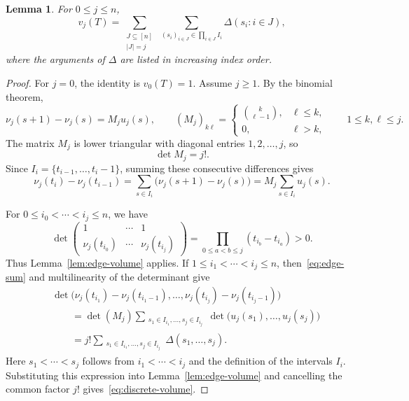 \documentclass[a4paper,reqno,11pt,oneside]{amsart}
\newtheorem{lem}[thm]{Lemma}
\theoremstyle{definition}
\theoremstyle{remark}
\begin{document}
\begin{lem}\label{lem:discrete-volume}
For $0\le j\le n$,
\begin{equation}\label{eq:discrete-volume}
    v_j(T)=\sum_{\substack{J\subseteq[n]\\|J|=j}} \ \sum_{(s_i)_{i\in J}\in\prod_{i\in J}I_i} \Delta(s_i:i\in J),
\end{equation}
where the arguments of $\Delta$ are listed in increasing index order.
\end{lem}

\begin{proof}
For $j=0$, the identity is $v_0(T)=1$. Assume $j\ge1$. By the binomial theorem,
\[
\nu_j(s+1)-\nu_j(s)=M_j u_j(s),\qquad 
(M_j)_{k\ell}=
\begin{cases}
    \binom{k}{\ell-1},&\ell\le k,\\
    0,&\ell>k,
\end{cases}
\qquad 1\le k,\ell\le j.
\]
The matrix $M_j$ is lower triangular with diagonal entries $1,2,\ldots,j$, so
\[
\det M_j=j!.
\]
Since $I_i=\{t_{i-1},\ldots,t_i-1\}$, summing these consecutive differences gives
\begin{equation}\label{eq:edge-sum}
    \nu_j(t_i)-\nu_j(t_{i-1}) 
    =\sum_{s\in I_i}\bigl(\nu_j(s+1)-\nu_j(s)\bigr)
    =M_j\sum_{s\in I_i}u_j(s).
\end{equation}

For $0\le i_0<\cdots<i_j\le n$, we have
\[
\det\begin{pmatrix}
    1&\cdots&1\\
    \nu_j(t_{i_0})&\cdots&\nu_j(t_{i_j})
\end{pmatrix}
=\prod_{0\le a<b\le j}(t_{i_b}-t_{i_a})>0.
\]
Thus Lemma~\ref{lem:edge-volume} applies. If $1\le i_1<\cdots<i_j\le n$, then~\eqref{eq:edge-sum} and multilinearity of the determinant give
\begin{align*}
 &\det\bigl(\nu_j(t_{i_1})-\nu_j(t_{i_1-1}),\ldots,
             \nu_j(t_{i_j})-\nu_j(t_{i_j-1})\bigr)\\
 &\qquad=\det(M_j)
   \sum_{\substack{s_1\in I_{i_1},\ldots,s_j\in I_{i_j}}}
   \det\bigl(u_j(s_1),\ldots,u_j(s_j)\bigr)\\
 &\qquad=j!
   \sum_{\substack{s_1\in I_{i_1},\ldots,s_j\in I_{i_j}}}
   \Delta(s_1,\ldots,s_j).
\end{align*}
Here $s_1<\cdots<s_j$ follows from $i_1<\cdots<i_j$ and the definition of the intervals $I_i$. Substituting this expression into
Lemma~\ref{lem:edge-volume} and cancelling the common factor $j!$ gives~\eqref{eq:discrete-volume}.
\end{proof}
\end{document}
